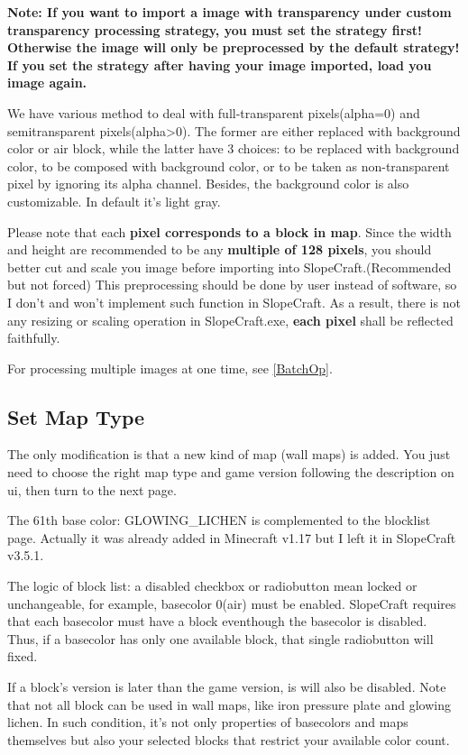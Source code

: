 \documentclass{article}
\begin{document}
    \textbf{Note: If you want to import a image with transparency under custom transparency processing strategy, you must set the strategy first! Otherwise the image will only be preprocessed by the default strategy! If you set the strategy after having your image imported, load you image again.}

    We have various method to deal with full-transparent pixels(alpha=0) and semitransparent pixels(alpha>0). The former are either replaced with background color or air block, while the latter have 3 choices: to be replaced with background color, to be composed with background color, or to be taken as non-transparent pixel by ignoring its alpha channel. Besides, the background color is also customizable. In default it's light gray.

    Please note that each \textbf{pixel corresponds to a block in map}. Since the width and height are recommended to be any \textbf{multiple of 128 pixels}, you should better cut and scale you image before importing into SlopeCraft.(Recommended but not forced) This preprocessing should be done by user instead of software, so I don't and won't implement such function in SlopeCraft. As a result, there is not any resizing or scaling operation in SlopeCraft.exe, \textbf{each pixel} shall be reflected faithfully.

    For processing multiple images at one time, see \ref{BatchOp}.

    \subsection{Set Map Type}
    The only modification is that a new kind of map (wall maps) is added. You just need to choose the right map type and game version following the description on ui, then turn to the next page.

    The 61th base color: GLOWING\_LICHEN is complemented to the blocklist page. Actually it was already added in Minecraft v1.17 but I left it in SlopeCraft v3.5.1.

    The logic of block list: a disabled checkbox or radiobutton mean locked or unchangeable, for example, basecolor 0(air) must be enabled. SlopeCraft requires that each basecolor must have a block eventhough the basecolor is disabled. Thus, if a basecolor has only one available block, that single radiobutton will fixed.
    
    If a block's version is later than the game version, is will also be disabled. Note that not all block can be used in wall maps, like iron pressure plate and glowing lichen. In such condition, it's not only properties of basecolors and maps themselves but also your selected blocks that restrict your available color count.
\end{document}
